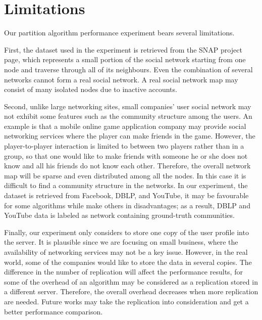 \section{Limitations} \label{sec:sec5}

Our partition algorithm performance experiment bears several limitations.

First, the dataset used in the experiment is retrieved from the SNAP project page, which represents a small portion of the social network starting from one node and traverse through all of its neighbours. Even the combination of several networks cannot form a real social network. A real social network map may consist of many isolated nodes due to inactive accounts. 

Second, unlike large networking sites, small companies' user social network may not exhibit some features such as the community structure among the users. An example is that a mobile online game application company may provide social networking services where the player can make friends in the game. However, the player-to-player interaction is limited to between two players rather than in a group, so that one would like to make friends with someone he or she does not know and all his friends do not know each other. Therefore, the overall network map will be sparse and even distributed among all the nodes. In this case it is difficult to find a community structure in the networks. In our experiment, the dataset is retrieved from Facebook, DBLP, and YouTube, it may be favourable for some algorithms while make others in disadvantages; as a result, DBLP and YouTube data is labeled as network containing ground-truth communities.

Finally, our experiment only considers to store one copy of the user profile into the server. It is plausible since we are focusing on small business, where the availability of networking services may not be a key issue. However, in the real world, some of the companies would like to store the data in several copies. The difference in the number of replication will affect the performance results, for some of the overhead of an algorithm may be considered as a replication stored in a different server. Therefore, the overall overhead decreases when more replication are needed. Future works may take the replication into consideration and get a better performance comparison. 
